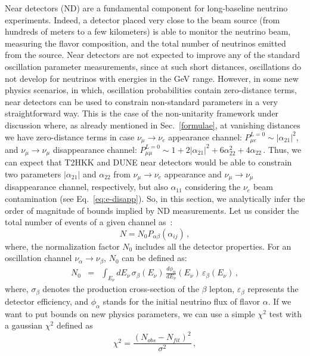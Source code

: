 \documentclass[11pt,a4paper]{article}
\begin{document}
Near detectors (ND) are a fundamental component for long-baseline neutrino experiments. Indeed, a detector placed very close to the beam source (from hundreds of meters to a few kilometers) is able to monitor the neutrino beam, measuring the flavor composition, and the total number of neutrinos emitted from the source. 
Near detectors are not expected to improve any of the standard oscillation parameter measurements, since at such short distances, oscillations do not develop for neutrinos with energies in the GeV range.
 However, in some new physics scenarios, in which, oscillation probabilities contain  zero-distance terms, near detectors can be used to constrain non-standard parameters in a very straightforward way. This is the case of the non-unitarity framework under discussion where, as already mentioned in Sec.~\ref{formulae}, at vanishing distances we have zero-distance terms in case $\nu_{\mu}\rightarrow\nu_{e}$ appearance channel: $
P_{\mu e}^{L = 0} \sim |\alpha_{21}|^2$, and $\nu_{\mu}\rightarrow\nu_{\mu}$ disappearance channel:
$P_{\mu\mu}^{L = 0} \sim 1+ 2 |\alpha_{21}|^2+6 \alpha_{22}^2+4 \alpha_{22}\,.$
Thus, we can expect that T2HKK and DUNE near detectors would be able to constrain two parameters $|\alpha_{21}|$ and $\alpha_{22}$ from $\nu_{\mu}\rightarrow\nu_e$ appearance and $\nu_{\mu}\rightarrow\nu_{\mu}$ disappearance channel, respectively, but also $\alpha_{11}$ considering the $\nu_e$ beam contamination (see Eq.~\ref{eq:e-disapp}). So, in this section, we analytically infer the order of magnitude of bounds implied by ND measurements.
Let us  consider the total number of events of a given channel as~\cite{Giarnetti:2020bmf}:
\begin{equation}
    N= N_0 P_{\alpha\beta}(\alpha_{ij})\,,
\end{equation}
where, the normalization factor $N_0$ includes all the detector properties. For an oscillation channel $\nu_\alpha\to\nu_\beta$, $N_0$ can be defined as:
\begin{eqnarray}
\label{eq:asirate2}
N_0 &=&\int_{E_\nu} dE_\nu \,\sigma_\beta(E_\nu)\,\frac{d\phi_\alpha}{dE_\nu}(E_\nu) \,\varepsilon_\beta(E_\nu)\,,
\end{eqnarray} 
where, $\sigma_\beta$ denotes the production cross-section of  the $\beta$ lepton, $\varepsilon_\beta$ represents the detector efficiency, and $\phi_\alpha$ stands for the initial neutrino flux of flavor $\alpha$. If we want to put bounds on new physics parameters, we can use a simple $\chi^2$ test with a gaussian $\chi^2$ defined as 
\begin{equation}
    \chi^2=\frac{(N_{obs}-N_{fit})^2}{\sigma^2}\,,
\end{equation} 
\end{document}
